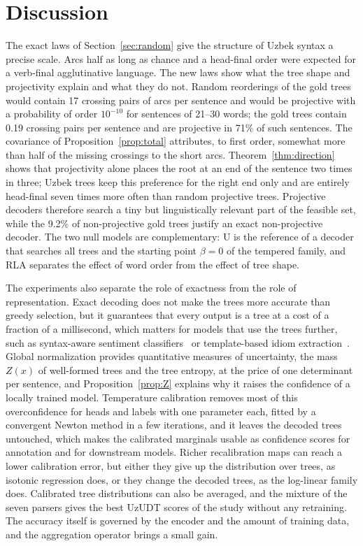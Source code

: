 \documentclass[mathematics,article,submit,pdftex,oneauthor]{Definitions/mdpi}
\begin{document}


\section{Discussion}\label{sec:discussion}

The exact laws of Section~\ref{sec:random} give the structure of Uzbek syntax a precise scale.
Arcs half as long as chance and a head-final order were expected for a verb-final agglutinative language.
The new laws show what the tree shape and projectivity explain and what they do not.
Random reorderings of the gold trees would contain 17 crossing pairs of arcs per sentence and would be projective with a probability of order $10^{-10}$ for sentences of 21--30 words; the gold trees contain 0.19 crossing pairs per sentence and are projective in 71\% of such sentences.
The covariance of Proposition~\ref{prop:total} attributes, to first order, somewhat more than half of the missing crossings to the short arcs.
Theorem~\ref{thm:direction} shows that projectivity alone places the root at an end of the sentence two times in three; Uzbek trees keep this preference for the right end only and are entirely head-final seven times more often than random projective trees.
Projective decoders therefore search a tiny but linguistically relevant part of the feasible set, while the 9.2\% of non-projective gold trees justify an exact non-projective decoder.
The two null models are complementary: U is the reference of a decoder that searches all trees and the starting point $\beta=0$ of the tempered family, and RLA separates the effect of word order from the effect of tree shape.

The experiments also separate the role of exactness from the role of representation.
Exact decoding does not make the trees more accurate than greedy selection, but it guarantees that every output is a tree at a cost of a fraction of a millisecond, which matters for models that use the trees further, such as syntax-aware sentiment classifiers~\cite{Chen2023DualGCN,Yang2022DepPOS} or template-based idiom extraction~\cite{Nazirova2026}.
Global normalization provides quantitative measures of uncertainty, the mass $Z(x)$ of well-formed trees and the tree entropy, at the price of one determinant per sentence, and Proposition~\ref{prop:Z} explains why it raises the confidence of a locally trained model.
Temperature calibration removes most of this overconfidence for heads and labels with one parameter each, fitted by a convergent Newton method in a few iterations, and it leaves the decoded trees untouched, which makes the calibrated marginals usable as confidence scores for annotation and for downstream models.
Richer recalibration maps can reach a lower calibration error, but either they give up the distribution over trees, as isotonic regression does, or they change the decoded trees, as the log-linear family does.
Calibrated tree distributions can also be averaged, and the mixture of the seven parsers gives the best UzUDT scores of the study without any retraining.
The accuracy itself is governed by the encoder and the amount of training data, and the aggregation operator brings a small gain.
\end{document}
